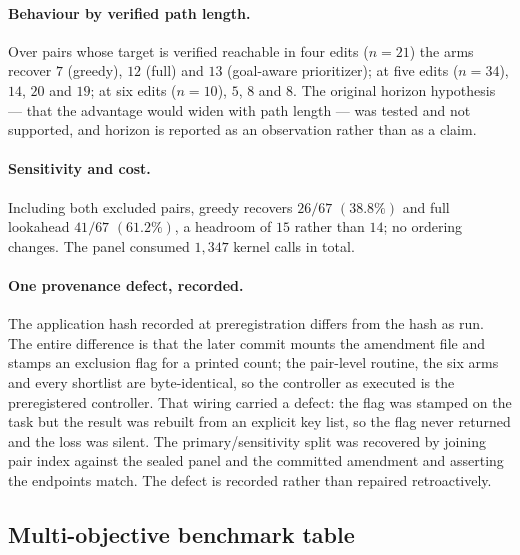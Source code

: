 \paragraph{Behaviour by verified path length.}
Over pairs whose target is verified reachable in four edits ($n=21$) the arms recover $7$ (greedy), $12$ (full) and $13$ (goal-aware prioritizer); at five edits ($n=34$), $14$, $20$ and $19$; at six edits ($n=10$), $5$, $8$ and $8$. The original horizon hypothesis --- that the advantage would widen with path length --- was tested and not supported, and horizon is reported as an observation rather than as a claim.

\paragraph{Sensitivity and cost.}
Including both excluded pairs, greedy recovers $26/67$ $(38.8\%)$ and full lookahead $41/67$ $(61.2\%)$, a headroom of $15$ rather than $14$; no ordering changes. The panel consumed $1{,}347$ kernel calls in total.

\paragraph{One provenance defect, recorded.}
The application hash recorded at preregistration differs from the hash as run. The entire difference is that the later commit mounts the amendment file and stamps an exclusion flag for a printed count; the pair-level routine, the six arms and every shortlist are byte-identical, so the controller as executed is the preregistered controller. That wiring carried a defect: the flag was stamped on the task but the result was rebuilt from an explicit key list, so the flag never returned and the loss was silent. The primary/sensitivity split was recovered by joining pair index against the sealed panel and the committed amendment and asserting the endpoints match. The defect is recorded rather than repaired retroactively.

\subsection{Multi-objective benchmark table}

